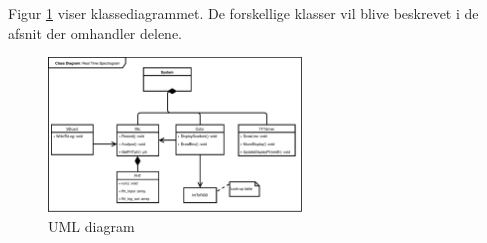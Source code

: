 Figur \ref{fig:uml} viser klassediagrammet. De forskellige klasser vil blive beskrevet i de afsnit der omhandler delene.

\begin{figure}[H]
	\center
	\includegraphics[width = 0.6\textwidth]{Figur/UML.pdf}
	\caption{UML diagram}
	\label{fig:uml}
\end{figure}

%